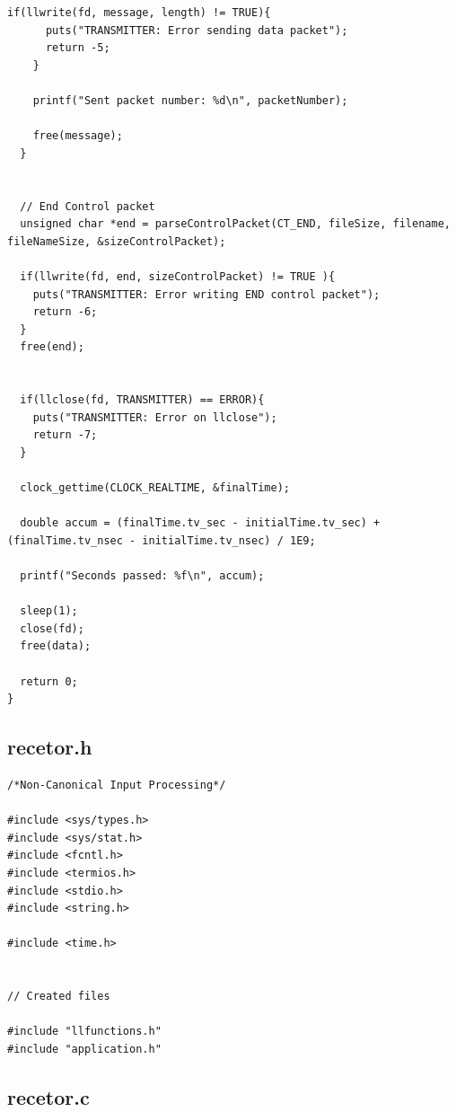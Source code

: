 \documentclass{article}
\begin{document}
\begin{lstlisting}[style=CStyle]
    if(llwrite(fd, message, length) != TRUE){
      puts("TRANSMITTER: Error sending data packet");
      return -5;
    }

    printf("Sent packet number: %d\n", packetNumber);

    free(message);
  }


  // End Control packet
  unsigned char *end = parseControlPacket(CT_END, fileSize, filename, fileNameSize, &sizeControlPacket);

  if(llwrite(fd, end, sizeControlPacket) != TRUE ){
    puts("TRANSMITTER: Error writing END control packet");
    return -6;
  }
  free(end);


  if(llclose(fd, TRANSMITTER) == ERROR){
    puts("TRANSMITTER: Error on llclose");
    return -7;
  }

  clock_gettime(CLOCK_REALTIME, &finalTime);

  double accum = (finalTime.tv_sec - initialTime.tv_sec) + (finalTime.tv_nsec - initialTime.tv_nsec) / 1E9;

  printf("Seconds passed: %f\n", accum);

  sleep(1);
  close(fd);
  free(data);

  return 0;
}
\end{lstlisting}


\subsection{recetor.h}

\begin{lstlisting}[style=CStyle]
/*Non-Canonical Input Processing*/

#include <sys/types.h>
#include <sys/stat.h>
#include <fcntl.h>
#include <termios.h>
#include <stdio.h>
#include <string.h>

#include <time.h>


// Created files

#include "llfunctions.h"
#include "application.h"
\end{lstlisting}

\subsection{recetor.c}
\end{document}
